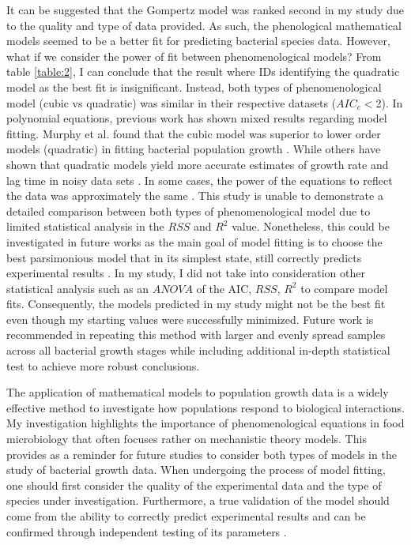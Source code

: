 \documentclass[11pt]{article}
\begin{document}
It can be suggested that the Gompertz model was ranked second in my study due to the quality and type of data provided. As such, the phenological
mathematical models seemed to be a better fit for predicting bacterial species data. However, what if we consider the power of fit between
phenomenological models? From table \ref{table:2}, I can conclude that the result where IDs identifying the quadratic model as the best fit is insignificant.
Instead, both types of phenomenological model (cubic vs quadratic) was similar in their respective datasets ($AIC_{c}<$2). In polynomial equations, previous work has shown mixed 
results regarding model fitting. Murphy et al. found that the cubic model was superior to lower order models (quadratic) in fitting bacterial population 
growth \cite{murphy_development_1996}. While others have shown that quadratic models yield more accurate estimates of growth rate and lag time in noisy data sets \cite{ng_mathematical_1997,gauch_prediction_1993,mcclure_predictive_1997}.
In some cases, the power of the equations to reflect the data was approximately the same \cite{gibson_predicting_1988}. This study is unable to demonstrate a 
detailed comparison between both types of phenomenological model due to limited statistical analysis in the $RSS$ and $R^{2}$ value. 
Nonetheless, this could be investigated in future works as the main goal of model fitting is to choose the best parsimonious model that in its 
simplest state, still correctly predicts experimental results \cite{gauch_prediction_1993,gibson_predicting_1988}. In my study, I did not take into consideration other statistical analysis
such as an $ANOVA$ of the AIC, $RSS$, $R^{2}$ to compare model fits. Consequently, the models predicted in my study might not be the best fit even 
though my starting values were successfully minimized. Future work is recommended in repeating this method with larger and evenly spread 
samples across all bacterial growth stages while including additional in-depth statistical test to achieve more robust conclusions.

The application of mathematical models to population growth data is a widely effective method to investigate how populations respond to 
biological interactions. My investigation highlights the importance of phenomenological equations in food microbiology that often focuses rather
on mechanistic theory models. This provides as a reminder for future studies to consider both types of models in the study of bacterial growth data.
When undergoing the process of model fitting, one should first consider the quality of the experimental data and the type of species under
investigation. Furthermore, a true validation of the model should come from the ability to correctly predict experimental results and can be 
confirmed through independent testing of its parameters \cite{peleg_microbial_2011}.
\end{document}
